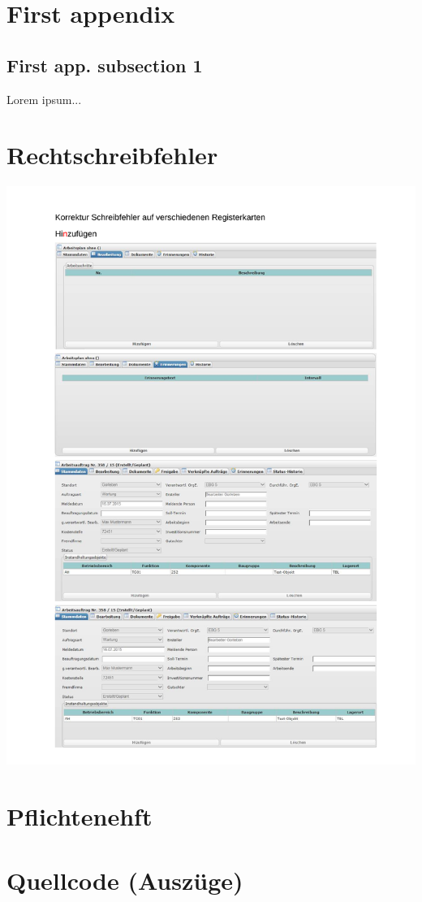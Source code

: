 \documentclass[12pt]{scrartcl}
\begin{document}
\begin{appendices}
\renewcommand{\thesection}{\arabic{section}} %


	\section{First appendix}		
		\subsection{First app. subsection 1}
		Lorem ipsum...

	\newpage
	\section{Rechtschreibfehler}
		\begin{center}
			\includegraphics[page=1, width=.85\textwidth]{pdf/test.pdf}		
		\end{center}

	\newpage		
	\section{Pflichtenehft}
		
		
	\newpage
	\section{Quellcode (Auszüge)}
		


\end{appendices}

\clearpage
\listoffigures
\newpage

\listoftables
\newpage
\end{document}
